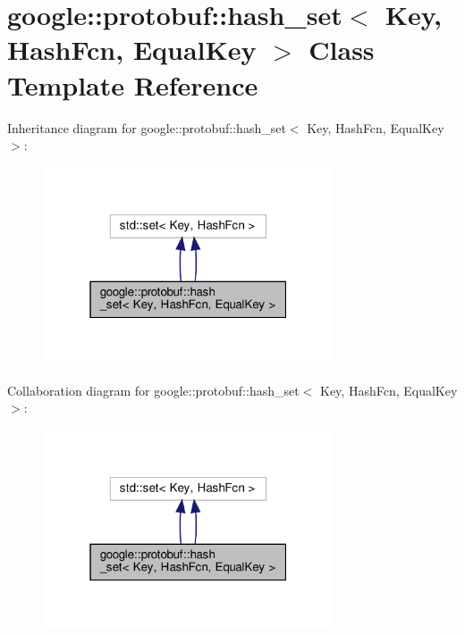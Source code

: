 \hypertarget{classgoogle_1_1protobuf_1_1hash__set}{}\section{google\+:\+:protobuf\+:\+:hash\+\_\+set$<$ Key, Hash\+Fcn, Equal\+Key $>$ Class Template Reference}
\label{classgoogle_1_1protobuf_1_1hash__set}


Inheritance diagram for google\+:\+:protobuf\+:\+:hash\+\_\+set$<$ Key, Hash\+Fcn, Equal\+Key $>$\+:
\nopagebreak
\begin{figure}[H]
\begin{center}
\leavevmode
\includegraphics[width=244pt]{classgoogle_1_1protobuf_1_1hash__set__inherit__graph}
\end{center}
\end{figure}


Collaboration diagram for google\+:\+:protobuf\+:\+:hash\+\_\+set$<$ Key, Hash\+Fcn, Equal\+Key $>$\+:
\nopagebreak
\begin{figure}[H]
\begin{center}
\leavevmode
\includegraphics[width=244pt]{classgoogle_1_1protobuf_1_1hash__set__coll__graph}
\end{center}
\end{figure}

